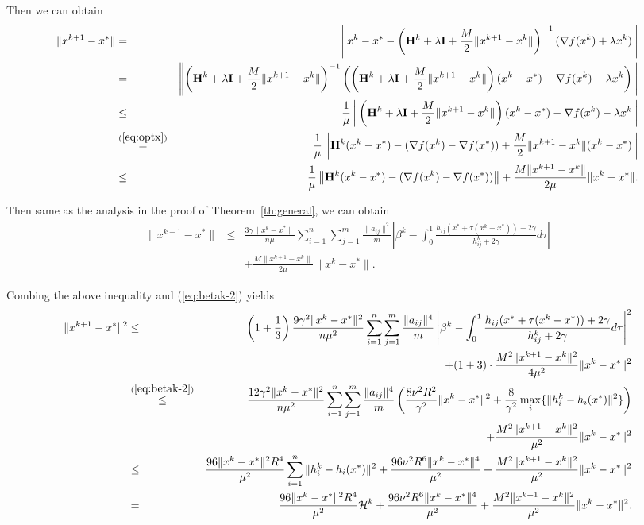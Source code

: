 \documentclass[12pt]{article}
\newcommand{\newalpha}{h}
\newcommand{\mH}{\mathbf{H}}
\newcommand{\mI}{\mathbf{I}}
\begin{document}
Then we can obtain 
\begin{eqnarray*}
	\|x^{k+1} - x^*\| &=& \left \| x^k - x^* - \left(\mH^k + \lambda \mI +  \frac{M}{2}\|x^{k+1} - x^k\| \right)^{-1} (\nabla f(x^k) + \lambda x^k) \right\| \\
	&=& \left\| \left(\mH^k + \lambda \mI + \frac{M}{2}\|x^{k+1} - x^k\| \right)^{-1} \left(  \left( \mH^k + \lambda \mI + \frac{M}{2}\|x^{k+1} - x^k\| \right) (x^k - x^*) - \nabla f(x^k) - \lambda x^k  \right) \right\| \\ 
	&\leq& \frac{1}{\mu}  \left\|  \left(\mH^k + \lambda \mI +  \frac{M}{2}\|x^{k+1} - x^k\| \right)(x^k - x^*) - \nabla f(x^k) - \lambda x^k  \right \| \\ 
	&\overset{(\ref{eq:optx})}{=}& \frac{1}{\mu} \left\| \mH^k (x^k - x^*) - (\nabla f(x^k) - \nabla f(x^*)) +  \frac{M}{2}\|x^{k+1} - x^k\|(x^k - x^*) \right\| \\ 
	&\leq& \frac{1}{\mu} \left\| \mH^k (x^k - x^*) - (\nabla f(x^k) - \nabla f(x^*)) \right\|  + \frac{M\|x^{k+1} - x^k\|}{2\mu} \| x^k - x^* \|. 
\end{eqnarray*}

Then same as the analysis in the proof of Theorem~\ref{th:general}, we can obtain 
\begin{eqnarray*}
	\|x^{k+1} - x^*\| &\leq& \frac{3\gamma\|x^k - x^*\|}{n \mu} \sum_{i=1}^n \sum_{j=1}^{m} \frac{\|a_{ij}\|^2}{m} \left|   \beta^k - \int_{0}^1 \frac{\newalpha_{ij}(x^* + \tau(x^k - x^*)) + 2\gamma}{ h_{ij}^k + 2\gamma} d\tau   \right| \\ 
	&& +  \frac{M\|x^{k+1} - x^k\|}{2\mu} \| x^k - x^* \|.
\end{eqnarray*}

Combing the above inequality and (\ref{eq:betak-2}) yields 
\begin{eqnarray*}
	\|x^{k+1} - x^*\|^2 &\leq& \left(  1 + \frac{1}{3}  \right) \frac{9\gamma^2 \|x^k - x^*\|^2}{n \mu^2} \sum_{i=1}^n \sum_{j=1}^{m} \frac{\|a_{ij}\|^4}{m} \left|   \beta^k - \int_{0}^1 \frac{\newalpha_{ij}(x^* + \tau(x^k - x^*)) + 2\gamma}{ h_{ij}^k + 2\gamma} d\tau   \right|^2 \\
	&& + (1 + 3) \cdot \frac{M^2\|x^{k+1} - x^k\|^2}{4\mu^2} \| x^k - x^* \|^2 \\
	&\overset{(\ref{eq:betak-2})}{\leq}& \frac{12 \gamma^2\|x^k - x^*\|^2}{n \mu^2} \sum_{i=1}^n \sum_{j=1}^{m} \frac{\|a_{ij}\|^4}{m} \left(  \frac{8\nu^2 R^2}{\gamma^2} \|x^k - x^*\|^2 + \frac{8}{\gamma^2} \max_{i} \{\|h_i^k - \newalpha_i(x^*)\|^2 \}    \right) \\ 
	&& +  \frac{M^2\|x^{k+1} - x^k\|^2}{\mu^2} \| x^k - x^* \|^2 \\ 
	&\leq&  \frac{96\|x^k - x^*\|^2 R^4}{\mu^2} \sum_{i=1}^n \|h_i^k - \newalpha_i(x^*)\|^2 +   \frac{96\nu^2 R^6\|x^k - x^*\|^4 }{\mu^2} +  \frac{M^2\|x^{k+1} - x^k\|^2}{\mu^2} \| x^k - x^* \|^2 \\ 
	&=&  \frac{96\|x^k - x^*\|^2 R^4}{\mu^2}{\cal H}^k  +   \frac{96\nu^2 R^6\|x^k - x^*\|^4 }{\mu^2} +  \frac{M^2\|x^{k+1} - x^k\|^2}{\mu^2} \| x^k - x^* \|^2. 
\end{eqnarray*}
\end{document}
